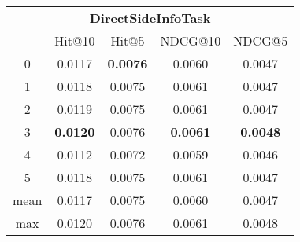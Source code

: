 \documentclass{article}
\begin{document}
 

\begin{tabular}{c|cccc}

\multicolumn{5}{c}{\textbf{DirectSideInfoTask}} \\
\noalign{\smallskip}
\noalign{\smallskip}
\toprule
\multicolumn{1}{c}{Template ID} & \multicolumn{1}{|c}{Hit@10} & \multicolumn{1}{c}{Hit@5} & \multicolumn{1}{c}{NDCG@10} & \multicolumn{1}{c}{NDCG@5} \\
\midrule
0 & 0.0117 & \textbf{0.0076} & 0.0060 & 0.0047 \\
1 & 0.0118 & 0.0075 & 0.0061 & 0.0047 \\
2 & 0.0119 & 0.0075 & 0.0061 & 0.0047 \\
3 & \textbf{0.0120} & 0.0076 & \textbf{0.0061} & \textbf{0.0048} \\
4 & 0.0112 & 0.0072 & 0.0059 & 0.0046 \\
5 & 0.0118 & 0.0075 & 0.0061 & 0.0047 \\
\midrule
mean & 0.0117 & 0.0075 & 0.0060 & 0.0047 \\
max & 0.0120 & 0.0076 & 0.0061 & 0.0048 \\
\bottomrule

\end{tabular}
\end{document}

